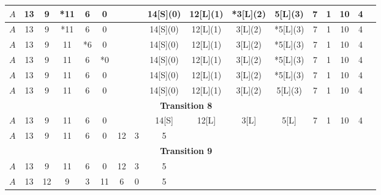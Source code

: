 \begin{center}
{\begin{tabular}{ | l | c | c | c | c | c | c | c | c | c | c | c | c | c | c | c | c | }
            $A$  & 13 & 9 & *11 & 6 & 0 & & & 14[S](0) & 12[L](1) & *3[L](2) & 5[L](3) & 7 & 1 & 10 & 4 \\ \hline
            $A$  & 13 & 9 & *11 & 6 & 0 & & & 14[S](0) & 12[L](1) & 3[L](2) & *5[L](3) & 7 & 1 & 10 & 4 \\ \hline
            $A$  & 13 & 9 & 11 & *6 & 0 & & & 14[S](0) & 12[L](1) & 3[L](2) & *5[L](3) & 7 & 1 & 10 & 4 \\ \hline
            $A$  & 13 & 9 & 11 & 6 & *0 & & & 14[S](0) & 12[L](1) & 3[L](2) & *5[L](3) & 7 & 1 & 10 & 4 \\ \hline
            $A$  & 13 & 9 & 11 & 6 & 0 & & & 14[S](0) & 12[L](1) & 3[L](2) & *5[L](3) & 7 & 1 & 10 & 4 \\ \hline
            $A$  & 13 & 9 & 11 & 6 & 0 & & & 14[S](0) & 12[L](1) & 3[L](2) & 5[L](3) & 7 & 1 & 10 & 4 \\ \hline
            \multicolumn{16}{c}{\textbf{Transition 8}}\\
            \hline
            $A$  & 13 & 9 & 11 & 6 & 0 & & & 14[S] & 12[L] & 3[L] & 5[L] & 7 & 1 & 10 & 4 \\ \hline
            $A$  & 13 & 9 & 11 & 6 & 0 & 12 & 3 & 5 & & & & & & &  \\ \hline
            \multicolumn{16}{c}{\textbf{Transition 9}}\\
            \hline
            $A$  & 13 & 9 & 11 & 6 & 0 & 12 & 3 & 5 & & & & & & &  \\ \hline
            $A$  & 13 & 12 & 9 & 3 & 11 & 6 & 0 & 5 & & & & & & &  \\ \hline
        \end{tabular}
        }
    \end{center}
